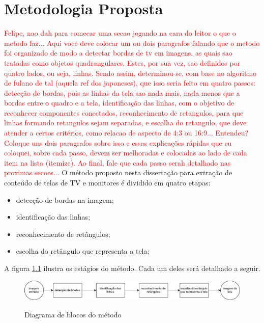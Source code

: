 
\chapter{Metodologia Proposta} \label{met}

\textcolor{red}{Felipe, nao dah para comecar uma secao jogando na cara do leitor o que o metodo faz... Aqui voce deve colocar um ou dois paragrafos falando que o metodo foi organizado de modo a detectar bordas de tv em imagens, as quais sao tratadas como objetos quadrangulares. Estes, por sua vez, sao definidos por quatro lados, ou seja, linhas. Sendo assim, determinou-se, com base no algoritmo de fulano de tal (aquela ref dos japoneses), que isso seria feito em quatro passos: detecção de bordas, pois as linhas da tela sao nada mais, nada menos que a bordas entre o quadro e a tela, identificação das linhas, com o objetivo de reconhecer componentes conectados, reconhecimento de retangulos, para que linhas formando retangulos sejam separadas, e escolha do retangulo, que deve atender a certos critérios, como relacao de aspecto de 4:3 ou 16:9... Entendeu? Coloque uns dois paragrafos sobre isso e essas explicações rápidas que eu coloquei, sobre cada passo, devem ser melhoradas e colocadas ao lado de cada item na lista (itemize). Ao final, fale que cada passo serah detalhado nas proximas secoes...}
O método proposto nesta dissertação para extração de conteúdo de telas de TV e monitores é dividido em quatro etapas:

\begin{itemize}
 \item detecção de bordas na imagem;
 \item identificação das linhas;
 \item reconhecimento de retângulos;
 \item escolha do retângulo que representa a tela;
\end{itemize}

A figura \ref{figdiag} ilustra os estágios do método. Cada um deles será detalhado a seguir.


\begin{figure} [h]
\includegraphics[width = \textwidth]{figuras/diag.pdf} \label{figdiag}
\caption{Diagrama de blocos do método}
\end{figure} 

